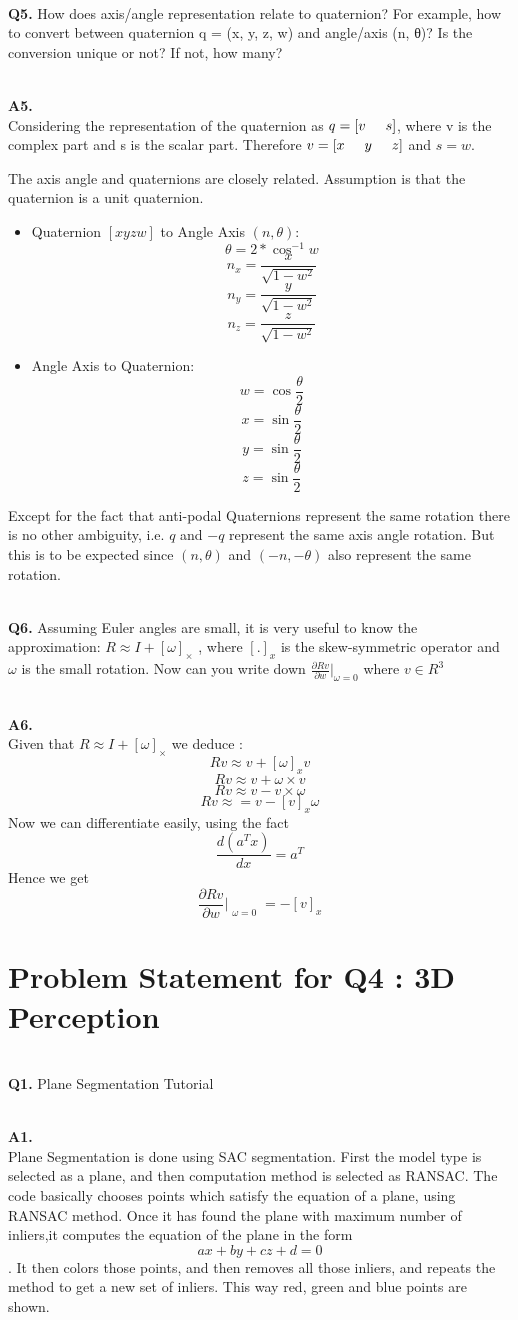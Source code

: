 \documentclass{article}
\newcommand\Problem[1]{
  \\
  \textbf{Q#1.}
}
\newcommand\Sol[1]{
  \\
  \textbf{A#1.}
  \\
}
\newcommand\tab[1][0.5cm]{\hspace*{#1}}
\begin{document}
\Problem{5} How does axis/angle representation relate to quaternion? For example, how to
convert between quaternion q = (x, y, z, w) and angle/axis (n, θ)? Is the conversion
unique or not? If not, how many?
\Sol{5}
Considering the representation of the quaternion as $q = [v \tab s]$, where v is the complex part
and s is the scalar part. Therefore $v = [x \tab y \tab z]$ and $s = w$.

The axis angle and quaternions are closely related. Assumption is that the quaternion is a unit quaternion.
\begin{itemize}
\item Quaternion $[x y z w]$ to Angle Axis $(n,\theta)$:
  $$\theta = 2 * \cos^{-1} w$$
  $$n_x = \frac{x}{\sqrt{1 - w^2}}$$
  $$n_y = \frac{y}{\sqrt{1 - w^2}}$$
  $$n_z = \frac{z}{\sqrt{1 - w^2}}$$
\item Angle Axis to Quaternion:
  $$w = \cos \frac{\theta}{2}$$
  $$x = \sin \frac{\theta}{2}$$
  $$y = \sin \frac{\theta}{2}$$
  $$z = \sin \frac{\theta}{2}$$
\end{itemize}

Except for the fact that anti-podal Quaternions represent the same rotation there is no other ambiguity, i.e. $q$ and
$-q$ represent the same axis angle rotation. But this is to be expected since $(n,\theta)$ and $(-n,-\theta)$ also represent
the same rotation.

\Problem{6} Assuming Euler angles are small, it is very useful to know the approximation:
$R \approx I + [\omega]_×$ , where $[.]_x$ is the skew-symmetric operator and $\omega$ is the small rotation.
Now can you write down $\frac{\partial Rv}{\partial w}|_{\omega = 0}$ where $v \in R^3$
\Sol{6}
Given that $R \approx I + [\omega]_×$ we deduce : $$Rv \approx v + [\omega]_xv$$
$$Rv \approx v + \omega \times v$$
$$Rv \approx v - v \times \omega$$
$$Rv \approx = v - [v]_x\omega$$
Now we can differentiate easily, using the fact
$$\frac{d(a^Tx)}{dx} = a^T$$
Hence we get
$$\frac{\partial Rv}{\partial w}|_{\substack{\omega = 0}} = -[v]_x$$

\section*{Problem Statement for Q4 : 3D Perception}
\Problem{1} Plane Segmentation Tutorial
\Sol{1} Plane Segmentation is done using SAC segmentation. First the model type is selected as a plane, and then computation method is selected as RANSAC. The code basically chooses points which satisfy the equation of a plane, using RANSAC method. Once it has found the plane with maximum number of inliers,it computes the equation of the plane in the form $$ax + by + cz + d = 0$$. It then colors those points, and then removes all those inliers, and repeats the method to get a new set of inliers. This way red, green and blue points are shown.
\end{document}
